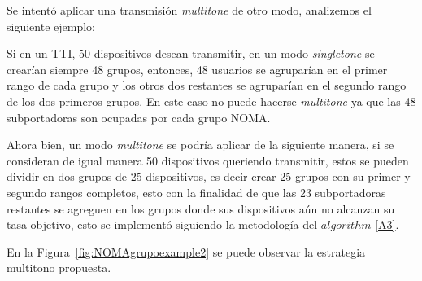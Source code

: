 Se intentó aplicar una transmisión \textit{multitone} de otro modo, analizemos el siguiente ejemplo: \newline

Si en un TTI, 50 dispositivos desean transmitir, en un modo \textit{singletone} se crearían siempre 48 grupos, entonces, 48 usuarios se agruparían en el primer rango de cada grupo y los otros dos restantes se agruparían en el segundo rango de los dos primeros grupos. En este caso no puede hacerse \textit{multitone} ya que las 48 subportadoras son ocupadas por cada grupo NOMA. \newline

Ahora bien, un modo \textit{multitone} se podría aplicar de la siguiente manera, si se consideran de igual manera 50 dispositivos queriendo transmitir, estos se pueden dividir en dos grupos de 25 dispositivos, es decir crear 25 grupos con su primer y segundo rangos completos, esto con la finalidad de que las 23 subportadoras restantes se agreguen en los grupos donde sus dispositivos aún no alcanzan su tasa objetivo, esto se implementó siguiendo la metodología del $algorithm$ \ref{A3}. \newline

En la Figura~\ref{fig:NOMAgrupoexample2} se puede observar la estrategia multitono propuesta.\newline

